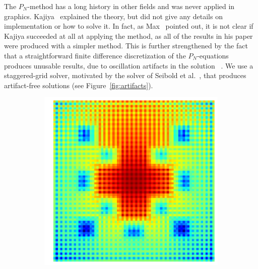 \documentclass{egpubl}
\begin{document}
The $P_N$-method has a long history in other fields and was never applied in graphics. Kajiya~\cite{Kajiya84} explained the theory, but did not give any details on implementation or how to solve it. In fact, as Max~\cite{Max95} pointed out, it is not clear if Kajiya succeeded at all at applying the method, as all of the results in his paper were produced with a simpler method. This is further strengthened by the fact that a straightforward finite difference discretization of the $P_N$-equations produces unusable results, due to oscillation artifacts in the solution ~\cite{Seibold14}. We use a staggered-grid solver, motivated by the solver of Seibold et al.~\cite{Seibold14}, that produces artifact-free solutions (see Figure~\ref{fig:artifacts}).
\begin{figure}[t]
\centering
\begin{subfigure}{0.45\columnwidth}
\includegraphics[width=\columnwidth]{checkerboard2d_p1_collocated.png}
\end{subfigure}%
\hspace{0.05\columnwidth}
\begin{subfigure}{0.45\columnwidth}

\end{subfigure}
\end{figure}
\end{document}
